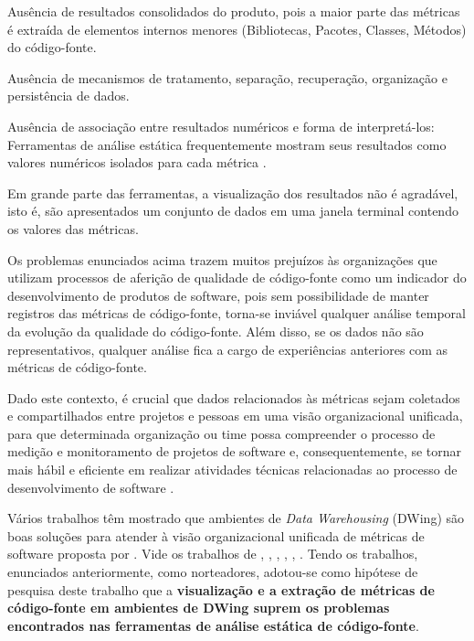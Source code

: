 
\begin{problems}
    \item Ausência de resultados consolidados do produto, pois a maior 
	parte das métricas é extraída de elementos internos menores (Bibliotecas, 
	Pacotes, Classes, Métodos) do código-fonte.
    
	\item Ausência de mecanismos de tratamento, separação, recuperação, 
	organização e persistência de dados. 
	
	\item Ausência de associação entre resultados numéricos e forma de 
	interpretá-los: Ferramentas de análise estática frequentemente mostram 
	seus resultados como valores numéricos isolados para cada métrica 
	\cite{Meirelles2013}. 
	
	\item Em grande parte das ferramentas, a visualização dos resultados não é 
	agradável, isto é, são apresentados um conjunto de dados em uma janela 
	terminal contendo os valores das métricas.
	
    \end{problems}
	
Os problemas enunciados acima trazem muitos prejuízos às organizações que 
utilizam processos de aferição de qualidade de código-fonte como um indicador do desenvolvimento de produtos de software, pois sem possibilidade de manter 
registros das métricas de código-fonte, torna-se inviável qualquer análise
temporal da evolução da qualidade do código-fonte. Além disso, se os dados não 
são representativos, qualquer análise fica a cargo de experiências anteriores 
com as métricas de código-fonte.

Dado este contexto, é crucial que dados relacionados às métricas sejam 
coletados e compartilhados entre projetos e pessoas em uma visão organizacional unificada, para que determinada organização ou time possa compreender o processo de medição e monitoramento de projetos de software e, 
consequentemente, se tornar mais hábil e eficiente em realizar atividades 
técnicas relacionadas ao processo de desenvolvimento de software 
\cite{Chulani2003}. 



Vários trabalhos têm mostrado que ambientes de \textit{Data Warehousing} 
(DWing) são boas soluções para atender à visão organizacional unificada de 
métricas de software proposta por . Vide os trabalhos 
de , , ,
, , . 
Tendo os trabalhos, enunciados anteriormente, como norteadores, adotou-se como 
hipótese de pesquisa deste trabalho que a \textbf{visualização e a extração 
de métricas de código-fonte em ambientes de DWing suprem os problemas 
encontrados nas ferramentas de análise estática de código-fonte}. 


